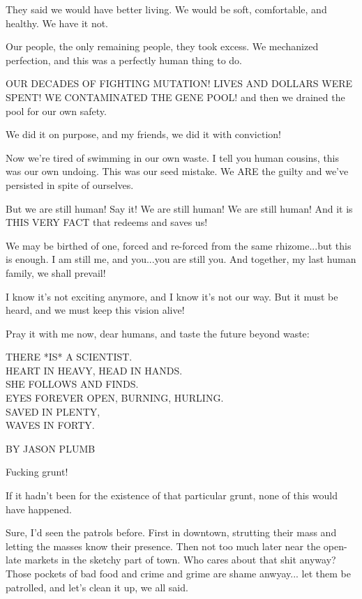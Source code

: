\documentclass{amsbook}
\begin{document}
They said we would have better living.  We would be soft, comfortable, and healthy.  We have it not.

Our people, the only remaining people, they took excess.  We mechanized perfection, and this was a perfectly human thing to do.

OUR DECADES OF FIGHTING MUTATION!  LIVES AND DOLLARS WERE SPENT!  WE CONTAMINATED THE GENE POOL!
and then we drained the pool for our own safety.  

We did it on purpose, and my friends, we did it with conviction!

Now we're tired of swimming in our own waste.
I tell you human cousins, this was our own undoing.  This was our seed mistake.  We ARE the guilty and we've persisted in spite of ourselves.

But we are still human!  Say it!  We are still human!  We are still human!
And it is THIS VERY FACT that redeems and saves us!

We may be birthed of one, forced and re-forced from the same rhizome...but this is enough.  I am still me, and you...you are still you.  And together, my last human family, we shall prevail!

I know it's not exciting anymore, and I know it's not our way.  But it must be heard, and we must keep this vision alive!

Pray it with me now, dear humans, and taste the future beyond waste:

THERE *IS* A SCIENTIST.  \\
HEART IN HEAVY, HEAD IN HANDS.  \\
SHE FOLLOWS AND FINDS.  \\
EYES FOREVER OPEN, BURNING, HURLING.\\
SAVED IN PLENTY,\\
WAVES IN FORTY.\\

\clearpage

{\ROBOFONTx BY JASON PLUMB}

Fucking grunt!

If it hadn't been for the existence of that particular grunt, none of this would have happened.

Sure, I'd seen the patrols before.  First in downtown, strutting their mass and letting the masses know their presence.  Then not too much later near the open-late markets in the sketchy part of town.  Who cares about that shit anyway?  Those pockets of bad food and crime and grime are shame anwyay... let them be patrolled, and let's clean it up, we all said.
\end{document}
